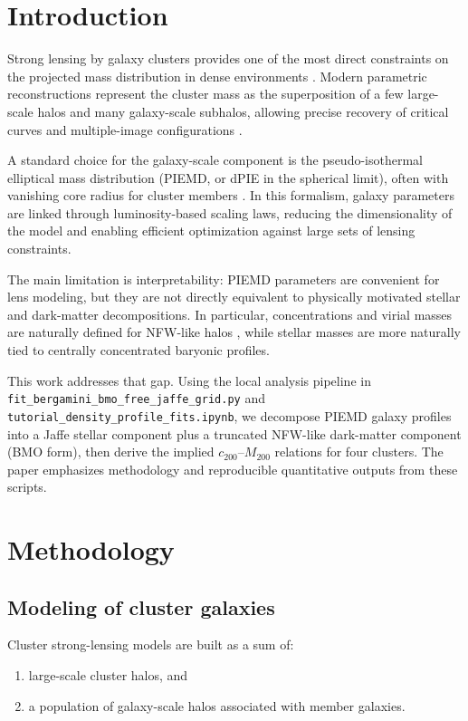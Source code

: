 \documentclass{aa}
\begin{document}
\section{Introduction}
Strong lensing by galaxy clusters provides one of the most direct constraints on the projected mass distribution in dense environments \citep{Bartelmann2001}. Modern parametric reconstructions represent the cluster mass as the superposition of a few large-scale halos and many galaxy-scale subhalos, allowing precise recovery of critical curves and multiple-image configurations \citep{Kneib1996,Jullo2007}.

A standard choice for the galaxy-scale component is the pseudo-isothermal elliptical mass distribution (PIEMD, or dPIE in the spherical limit), often with vanishing core radius for cluster members \citep{Jullo2007,Bergamini2019}. In this formalism, galaxy parameters are linked through luminosity-based scaling laws, reducing the dimensionality of the model and enabling efficient optimization against large sets of lensing constraints.

The main limitation is interpretability: PIEMD parameters are convenient for lens modeling, but they are not directly equivalent to physically motivated stellar and dark-matter decompositions. In particular, concentrations and virial masses are naturally defined for NFW-like halos \citep{NFW1997}, while stellar masses are more naturally tied to centrally concentrated baryonic profiles.

This work addresses that gap. Using the local analysis pipeline in \texttt{fit\_bergamini\_bmo\_free\_jaffe\_grid.py} and \texttt{tutorial\_density\_profile\_fits.ipynb}, we decompose PIEMD galaxy profiles into a Jaffe stellar component plus a truncated NFW-like dark-matter component (BMO form), then derive the implied $c_{200}$--$M_{200}$ relations for four clusters. The paper emphasizes methodology and reproducible quantitative outputs from these scripts.

\section{Methodology}

\subsection{Modeling of cluster galaxies}
Cluster strong-lensing models are built as a sum of:
\begin{enumerate}
\item large-scale cluster halos, and
\item a population of galaxy-scale halos associated with member galaxies.
\end{enumerate}
\end{document}
